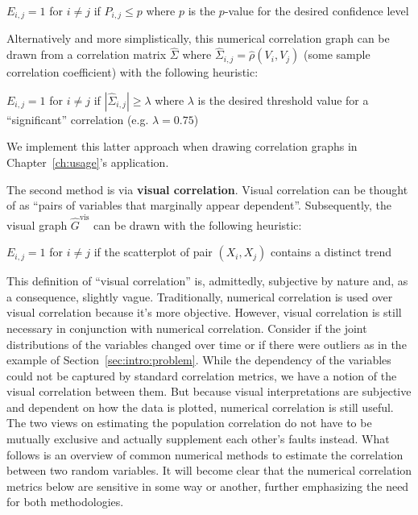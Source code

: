 \begin{algorithm}
	$E_{i,j} = 1$ for $i\neq j$ if $P_{i,j} \leq p$ where $p$ is the $p$-value 
	for the desired confidence level
\end{algorithm}

Alternatively and more simplistically, this numerical correlation graph can be 
drawn from a correlation matrix $\hat{\Sigma}$ where 
$\hat{\Sigma}_{i,j}=\hat{\rho}(V_i,V_j)$ (some sample correlation coefficient) 
with the following heuristic:\\

\begin{algorithm}
	$E_{i,j} = 1$ for $i\neq j$ if $|\hat{\Sigma}_{i,j}| \geq \lambda$ where 
	$\lambda$ is the desired threshold value for a ``significant'' correlation 
	(e.g. $\lambda = 0.75$)
\end{algorithm}

\noindent We implement this latter approach when drawing correlation 
graphs in Chapter~\ref{ch:usage}'s application.

The second method is via \textbf{visual correlation}. Visual correlation can be 
thought of as ``pairs of variables that marginally appear dependent''. 
Subsequently, the visual graph $\hat{G}^{\text{vis}}$ can be drawn with the 
following heuristic:\\

\begin{algorithm}
	$E_{i,j} = 1$ for $i\neq j$ if the scatterplot of pair $(X_i, X_j)$ 
	contains a distinct trend
\end{algorithm}

This definition of ``visual correlation'' is, admittedly, subjective by nature 
and, as a consequence, slightly vague. Traditionally, 
numerical correlation is used over visual correlation because it's more 
objective. However, visual correlation is still necessary in conjunction with 
numerical correlation. Consider if the joint distributions of the variables 
changed over time or if there were outliers as in the example of 
Section~\ref{sec:intro:problem}. While the dependency of the variables could 
not be captured by standard correlation metrics, we have a notion of the visual 
correlation between them. But because visual interpretations are subjective and 
dependent on how the data is plotted, numerical correlation is still useful. 
The two views on estimating the population correlation do not have to be 
mutually exclusive and actually supplement each other's faults instead.
What follows is an overview of common numerical methods 
to estimate the correlation between two random variables. It will become clear 
that the numerical correlation metrics below are sensitive in some way or 
another, further emphasizing the need for both methodologies.

